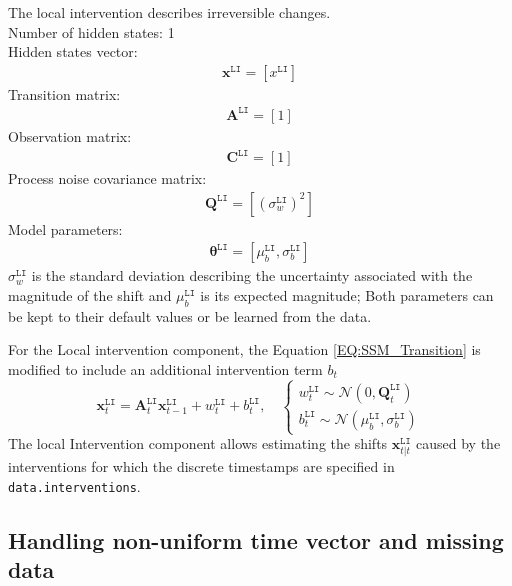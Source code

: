 The local intervention describes irreversible changes.\\

\noindent
Number of hidden states: 1\\

Hidden states vector: 
\begin{gather*}
\mathbf{x}^{\mathtt{LI}} = [x^{\mathtt{LI}}]
\end{gather*}
Transition matrix: 
\begin{gather*}
\mathbf{A}^{\mathtt{LI}}=[1]
\end{gather*}
Observation matrix: 
\begin{gather*}
\mathbf{C}^{\mathtt{LI}}=[1]
\end{gather*}
Process noise covariance matrix: 
\begin{gather*}
\mathbf{Q}^{\mathtt{LI}}=[(\sigma_{w}^{\mathtt{LI}})^{2}]
\end{gather*}
Model parameters: 
\begin{gather*}
\bm\theta^{\mathtt{LI}}=[\mu_{b}^{\mathtt{LI}}, \sigma_{b}^{\mathtt{LI}} ]
\end{gather*}
\noindent
$\sigma_{w}^{\mathtt{LI}}$ is the standard deviation describing the uncertainty associated with the magnitude of the shift and $\mu_{b}^{\mathtt{LI}}$ is its expected magnitude;  Both parameters can be kept to their default values or be learned from the data.

For the Local intervention component, the Equation \ref{EQ:SSM_Transition} is modified to include an additional  intervention term $b_{t}$
\begin{equation}
  \mathbf{x}_{t}^{\mathtt{LI}}=\mathbf{A}_{t}^{\mathtt{LI}}\mathbf{x}_{t-1}^{\mathtt{LI}}+{w}_{t}^{\mathtt{LI}}+b_{t}^{\mathtt{LI}},\quad\left\{
  \begin{array}{l}
{w}_{t}^{\mathtt{LI}}\sim \mathcal{N}({0},
\mathbf{Q}_{t}^{\mathtt{LI}})\\[4pt]
b_{t}^{\mathtt{LI}}\sim\mathcal{N}(\mu_{b}^{\mathtt{LI}},
\sigma_{b}^{\mathtt{LI}})
\end{array}\right.
\end{equation}
The local Intervention component allows estimating the shifts $\mathbf{x}_{t|t}^{\mathtt{LI}}$ caused by the interventions for which the discrete timestamps are specified in \lstinline[basicstyle = \mlttfamily \small, backgroundcolor = \color{light-gray}]!data.interventions!. 



\subsection{Handling non-uniform time vector and missing data}
\label{SS:HandlingNonUniformMissingData}

